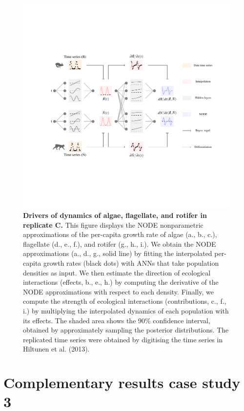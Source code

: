 \documentclass[11pt, oneside]{article}
\begin{document}
\newpage
\begin{figure}[H]
\includegraphics[width=1\linewidth,page=15]{figures/main.pdf}
\caption{
    \textbf{Drivers of dynamics of algae, flagellate, and rotifer in replicate C.}
    This figure displays the NODE nonparametric approximations of the per-capita growth rate of algae (a., b., c.), flagellate (d., e., f.), and rotifer (g., h., i.).
    We obtain the NODE approximations (a., d., g., solid line) by fitting the interpolated per-capita growth rates (black dots) with ANNs that take population densities as input.
    We then estimate the direction of ecological interactions (effects, b., e., h.) by computing the derivative of the NODE approximations with respect to each density.
    Finally, we compute the strength of ecological interactions (contributions, c., f., i.) by multiplying the interpolated dynamics of each population with its effects.
    The shaded area shows the 90\% confidence interval, obtained by approximately sampling the posterior distributions. 
    The replicated time series were obtained by digitising the time series in Hiltunen et al. (2013).
}
\end{figure}
\newpage

\newpage
\section{Complementary results case study 3}
\end{document}
